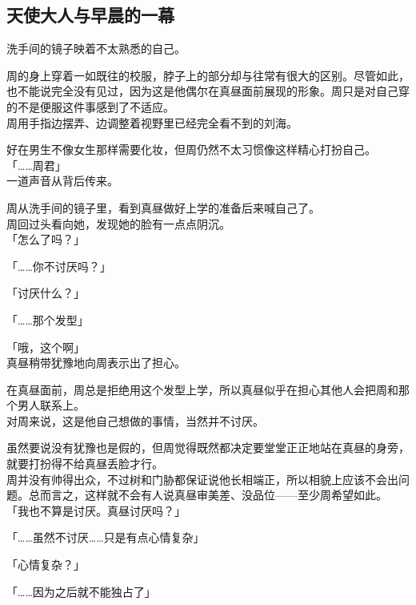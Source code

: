 \subsection{天使大人与早晨的一幕}

洗手间的镜子映着不太熟悉的自己。

周的身上穿着一如既往的校服，脖子上的部分却与往常有很大的区别。尽管如此，也不能说完全没有见过，因为这是他偶尔在真昼面前展现的形象。周只是对自己穿的不是便服这件事感到了不适应。\\

周用手指边摆弄、边调整着视野里已经完全看不到的刘海。

好在男生不像女生那样需要化妆，但周仍然不太习惯像这样精心打扮自己。\\

「……周君」\\

一道声音从背后传来。

周从洗手间的镜子里，看到真昼做好上学的准备后来喊自己了。\\

周回过头看向她，发现她的脸有一点点阴沉。\\

「怎么了吗？」

「……你不讨厌吗？」

「讨厌什么？」

「……那个发型」

「哦，这个啊」\\

真昼稍带犹豫地向周表示出了担心。

在真昼面前，周总是拒绝用这个发型上学，所以真昼似乎在担心其他人会把周和那个男人联系上。\\

对周来说，这是他自己想做的事情，当然并不讨厌。

虽然要说没有犹豫也是假的，但周觉得既然都决定要堂堂正正地站在真昼的身旁，就要打扮得不给真昼丢脸才行。\\

周并没有帅得出众，不过树和门胁都保证说他长相端正，所以相貌上应该不会出问题。总而言之，这样就不会有人说真昼审美差、没品位——至少周希望如此。\\

「我也不算是讨厌。真昼讨厌吗？」

「……虽然不讨厌……只是有点心情复杂」

「心情复杂？」

「……因为之后就不能独占了」\\

